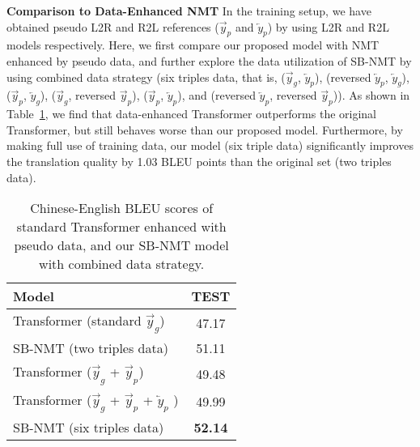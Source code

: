 \documentclass[11pt,a4paper]{article}
\begin{document}
\begin{CJK*}{UTF8}{gbsn}
\textbf{Comparison to Data-Enhanced NMT}
In the training setup, we have obtained pseudo L2R and R2L references ($\overrightarrow{y}_{p}$ and $\overleftarrow{y}_{p}$) by using L2R and R2L models respectively.
Here, we first compare our proposed model with NMT enhanced by pseudo data, and further explore the data utilization of SB-NMT by using combined data strategy (six triples data, that is, ($\overrightarrow{y}_{g}$, $\overleftarrow{y}_{p}$), (reversed $\overleftarrow{y}_{p}$, $\overleftarrow{y}_{g}$),
($\overrightarrow{y}_{p}$, $\overleftarrow{y}_{g}$), ($\overrightarrow{y}_{g}$, reversed $\overrightarrow{y}_{p}$),
($\overrightarrow{y}_{p}$, $\overleftarrow{y}_{p}$), and (reversed $\overleftarrow{y}_{p}$, reversed $\overrightarrow{y}_{p}$)).
As shown in Table~\ref{pesudo-data}, we find that data-enhanced Transformer outperforms the original Transformer, but still behaves worse than our proposed model.
Furthermore, by making full use of training data, our model (six triple data) significantly improves the translation quality by 1.03 BLEU points than the original set (two triples data).


\begin{table}
	\setlength{\belowcaptionskip}{-0.2cm}
	\centering
	\begin{tabular}{l|c}
		\hline
		Model                 &  TEST   \\
		\hline
		\hline
		Transformer (standard $\overrightarrow{y}_{g}$)             &  47.17  \\
		SB-NMT (two triples data)               &  51.11  \\
		\hline
		Transformer ($\overrightarrow{y}_{g}$ + $\overrightarrow{y}_{p}$)     &  49.48  \\
Transformer ($\overrightarrow{y}_{g}$ +  $\overrightarrow{y}_{p}$ + $\overleftarrow{y}_{p}$ )     &  49.99  \\
\hline
		SB-NMT (six triples data)         &  \textbf{52.14}   \\		
		\hline
	\end{tabular}
	\caption{Chinese-English BLEU scores of standard Transformer enhanced with pseudo data, and our SB-NMT model with combined data strategy.
	} 
	\label{pesudo-data}
\end{table}



\end{CJK*}
\end{document}
